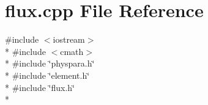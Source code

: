 \section{flux.\-cpp File Reference}
\label{flux_8cpp}
{\ttfamily \#include $<$iostream$>$}\\*
{\ttfamily \#include $<$cmath$>$}\\*
{\ttfamily \#include \char`\"{}physpara.\-h\char`\"{}}\\*
{\ttfamily \#include \char`\"{}element.\-h\char`\"{}}\\*
{\ttfamily \#include \char`\"{}flux.\-h\char`\"{}}\\*
